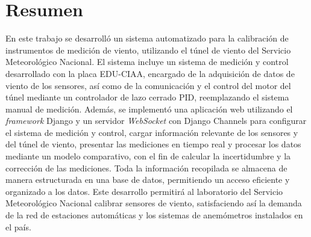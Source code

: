 \chapter*{Resumen}
En este trabajo se desarrolló un sistema automatizado para la calibración de instrumentos de medición de viento, utilizando el túnel de viento del Servicio Meteorológico Nacional. El sistema incluye un sistema de medición y control desarrollado con la placa EDU-CIAA, encargado de la adquisición de datos de viento de los sensores, así como de la comunicación y el control del motor del túnel mediante un controlador de lazo cerrado PID, reemplazando el sistema manual de medición. Además, se implementó una aplicación web utilizando el \textit{framework} Django y un servidor \textit{WebSocket} con Django Channels para configurar el sistema de medición y control, cargar información relevante de los sensores y del túnel de viento, presentar las mediciones en tiempo real y procesar los datos mediante un modelo comparativo, con el fin de calcular la incertidumbre y la corrección de las mediciones. Toda la información recopilada se almacena de manera estructurada en una base de datos, permitiendo un acceso eficiente y organizado a los datos. Este desarrollo permitirá al laboratorio del Servicio Meteorológico Nacional calibrar sensores de viento, satisfaciendo así la demanda de la red de estaciones automáticas y los sistemas de anemómetros instalados en el país.

